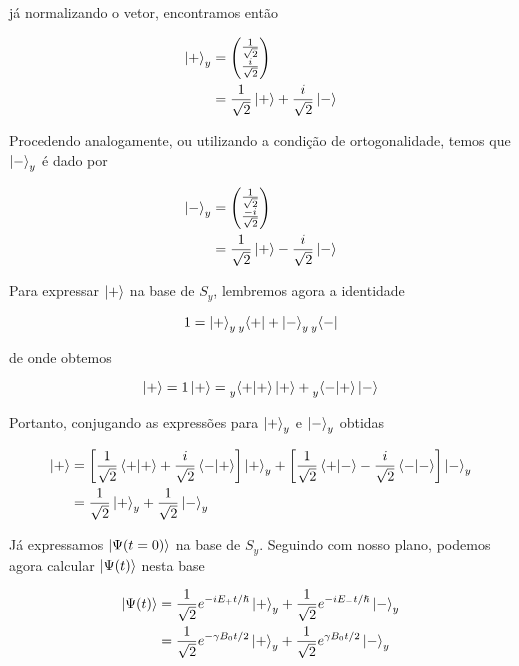 \documentclass[a4paper, 12pt, notitlepage]{article}
\begin{document}
\begin{enumerate}
\begin{enumerate}[(a)]
\noindent já normalizando o vetor, encontramos então

\begin{align*}
  \ket{+}_y &= \begin{pmatrix} \frac{1}{\sqrt{2}}\\ \frac{i}{\sqrt{2}} \end{pmatrix} \\
  &= \frac{1}{\sqrt{2}} \ket{+} + \frac{i}{\sqrt{2}} \ket{-}
\end{align*}

Procedendo analogamente, ou utilizando a condição de ortogonalidade, temos que $\ket{-}_y$ é dado por

\begin{align*}
  \ket{-}_y &= \begin{pmatrix} \frac{1}{\sqrt{2}}\\ \frac{-i}{\sqrt{2}} \end{pmatrix} \\
  &= \frac{1}{\sqrt{2}} \ket{+} - \frac{i}{\sqrt{2}} \ket{-}
\end{align*}

Para expressar $\ket{+}$ na base de $S_y$, lembremos agora a identidade

\[ 1 = \ket{+}_y \prescript{}{y}{\bra{+}} + \ket{-}_y \prescript{}{y}{\bra{-}} \]

\noindent de onde obtemos

\[ \ket{+} = 1\ket{+} = \prescript{}{y}{\left\langle + | + \right\rangle}\ket{+} + \prescript{}{y}{\left\langle - | + \right\rangle}\ket{-} \]

Portanto, conjugando as expressões para $\ket{+}_y$ e $\ket{-}_y$ obtidas

\begin{align*}
  \ket{+} &= \left[ \frac{1}{\sqrt{2}} \left\langle +|+ \right\rangle + \frac{i}{\sqrt{2}} \left\langle -|+ \right\rangle \right] \ket{+}_y + \left[ \frac{1}{\sqrt{2}} \left\langle +|- \right\rangle - \frac{i}{\sqrt{2}} \left\langle -|- \right\rangle \right] \ket{-}_y \\
  &= \frac{1}{\sqrt{2}} \ket{+}_y + \frac{1}{\sqrt{2}} \ket{-}_y
\end{align*}

Já expressamos $\ket{\Psi(t = 0)}$ na base de $S_y$. Seguindo com nosso plano, podemos agora calcular $\ket{\Psi(t)}$ nesta base

\begin{align*}
  \ket{\Psi(t)} &= \frac{1}{\sqrt{2}} e^{-iE_+ t/\hslash}\ket{+}_y + \frac{1}{\sqrt{2}} e^{-iE_-t/\hslash} \ket{-}_y \\
  &= \frac{1}{\sqrt{2}} e^{-\gamma B_0 t/2} \ket{+}_y + \frac{1}{\sqrt{2}} e^{\gamma B_0 t/2} \ket{-}_y
\end{align*}


\end{enumerate}
\end{enumerate}
\end{document}

